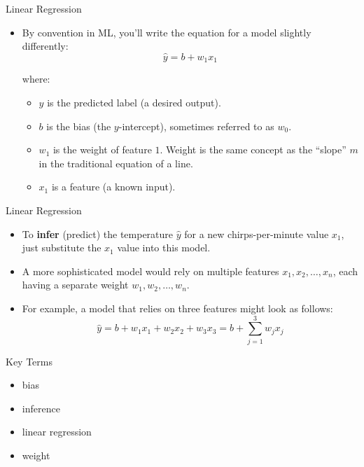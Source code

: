 \documentclass{beamer}
\begin{document}

\begin{frame}{Linear Regression}
\begin{itemize}
\item By convention in ML, you'll write the equation for a model slightly differently:
$$\hat{y} = b + w_1 x_1$$

where:

\medskip
\begin{itemize}
\item $y$ is the predicted label (a desired output).

\medskip
\item $b$ is the bias (the $y$-intercept), sometimes referred to as $w_0$.

\medskip
\item $w_1$ is the weight of feature $1$. Weight is the same concept as the ``slope'' $m$ in the traditional equation of a line.

\medskip
\item $x_1$ is a feature (a known input).
\end{itemize}
\end{itemize}
\end{frame}


\begin{frame}{Linear Regression}
\begin{itemize}
\item To {\bf infer} (predict) the temperature $\hat{y}$ for a new chirps-per-minute value $x_1$, just substitute the $x_1$ value into this model.

\medskip    
\item A more sophisticated model would rely on multiple features $x_1,x_2,\ldots,x_n$, each having a separate weight $w_1,w_2,\ldots, w_n$.

\medskip    
\item For example, a model that relies on three features might look as follows:
$$
\hat{y} = b + w_1 x_1 + w_2 x_2 + w_3 x_3 = b + \sum_{j=1}^3 w_j x_j 
$$
\end{itemize}
\end{frame}


\begin{frame}{Key Terms}
\begin{itemize}
    \item bias
    \item inference
    \item linear regression
    \item weight
\end{itemize}
\end{frame}
\end{document}
